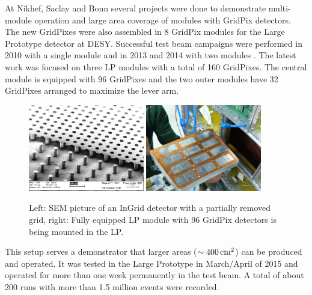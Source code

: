 At Nikhef, Saclay and Bonn several projects were done to demonstrate
multi-module operation and large area coverage of modules with GridPix
detectors. The new GridPixes were also assembled in 8
GridPix modules for the Large Prototype detector at DESY. Successful test beam
campaigns were performed in 2010 with a single module and in 2013 and 2014
with two modules
\cite{1748-0221-9-01-C01033}. The latest work was focused on three LP modules
with a total of 160 GridPixes. The central module is equipped with 96
GridPixes and the two outer modules have 32 GridPixes arranged to maximize the
lever arm.
\begin{figure}[!t]
  \centering
  \includegraphics[width=0.45\textwidth]{Tracker/TPC_Bonn/plots/TPC_pixels_GridPix.png}
  \includegraphics[width=0.45\textwidth]{Tracker/TPC_Bonn/plots/TPC_pixel_complete_module.png}
  \caption{Left: SEM picture of an InGrid detector with a partially removed
    grid, right: Fully equipped LP module with 96 GridPix detectors is being
    mounted in the LP.}
  \label{fig_TPC_pixels_1}
\end{figure}

This setup serves a demonstrator that larger areas ($\sim\unit[400]{cm^2}$) can be produced and operated. It was tested in the Large Prototype in
March/April of 2015 and operated for more than one week permanently in the
test beam. A total of about 200 runs with more than 1.5 million events were recorded.

